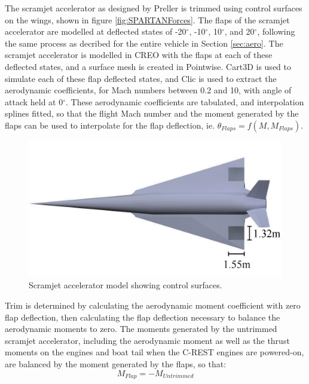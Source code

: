 		The scramjet accelerator as designed by Preller\cite{Preller2017b} is trimmed using control surfaces on the wings, shown in figure \ref{fig:SPARTANForces}. 
		The flaps of the scramjet accelerator are modelled at deflected states of -20$^\circ$, -10$^\circ$, 10$^\circ$, and 20$^\circ$, following the same process as decribed for the entire vehicle in Section \ref{sec:aero}. The scramjet accelerator is modelled in CREO with the flaps at each of these deflected states, and a surface mesh is created in Pointwise. 
		Cart3D is used to simulate each of these flap deflected states, and Clic is used to extract the aerodynamic coefficients, for Mach numbers between 0.2 and 10, with angle of attack held at 0$^\circ$. These aerodynamic coefficients are tabulated, and interpolation splines fitted, so that the flight Mach number and the moment generated by the flaps can be used to interpolate for the flap deflection, ie. $\theta_{Flaps} = f(M,M_{Flaps})$.
		\begin{figure}[ht]
			\centering
			\includegraphics[width=0.6\linewidth]{figures/3_vehicle_design/SPARTAN_FLAPS}
			\caption{Scramjet accelerator model showing control surfaces.}
			\label{fig:SPARTAN_FLAPS}
		\end{figure}
		Trim is determined by calculating the aerodynamic moment coefficient with zero flap deflection, then calculating the flap deflection necessary to balance the aerodynamic moments to zero. The moments generated by the untrimmed scramjet accelerator, including the aerodynamic moment as well as the thrust moments on the engines and boat tail when the C-REST engines are powered-on, are balanced by the moment generated by the flaps, so that:
		\begin{equation}
		M_{Flap} = -M_{Untrimmed}
		\end{equation}
		  
		
		 
		 
		

		
		
